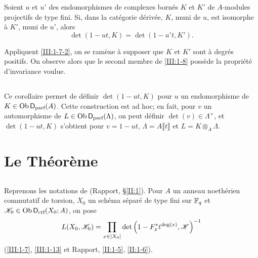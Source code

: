 \documentclass[oneside]{book}
\begin{document}
\begin{corollary_}\label{III:1-13}
Soient $u$ et $u'$ des endomorphismes de complexes born\'es $K$ et $K'$ de 
$A$-modules projectifs de type fini. Si, dans la cat\'egorie d\'eriv\'ee, $K$, 
muni de $u$, est isomorphe \`a $K'$, muni de $u'$, alors 
\[
  \det(1-u t,K) = \det(1-u' t,K') \text{.}
\]
\end{corollary_}

Appliquent \ref{III:1-7-2}, on se ram\`ene \`a supposer que $K$ et $K'$ sont \`a 
degr\'es positifs. On observe alors que le second membre de \ref{III:1-8} 
poss\`ede la propri\'et\'e d'invariance voulue. 





\subsection{}\label{III:1-14}

Ce corollaire permet de d\'efinir $\det(1-u t,K)$ pour $u$ un endomorphisme de 
$K\in \operatorname{Ob}\mathsf{D}_\text{parf}(A)$. Cette construction est ad hoc; en fait, pour $v$ un 
automorphisme de $L\in\operatorname{Ob}\mathsf{D}_\text{parf}(\Lambda)$, on peut d\'efinir 
$\det(v)\in\Lambda^\times$, et $\det(1-u t,K)$ s'obtient pour $v=1-u t$, 
$\Lambda=A\llbracket t\rrbracket$ et $L=K\otimes_A\Lambda$. 










\section{Le Th\'eor\`eme}\label{III:2}





\subsection{}\label{III:2-1}

Reprenons les notations de (Rapport, \S\ref{II:1}). Pour $A$ un anneau 
noeth\'erien commutatif de torsion, $X_0$ un sch\'ema s\'epar\'e de type fini sur 
$\mathbb{F}_q$ et $\mathscr{K}_0\in\operatorname{Ob}\mathsf{D}_\text{ctf}(X_0;A)$, on pose 
\[
  L(X_0,\mathscr{K}_0) = \prod_{x\in |X_0|} \det\left(1-F_x^* t^{\deg(x)}, \mathscr{K}\right)^{-1}
\]
(\ref{III:1-7}, \ref{III:1-13} et Rapport, \ref{II:1-5}, \ref{II:1-6}). 
\end{document}
